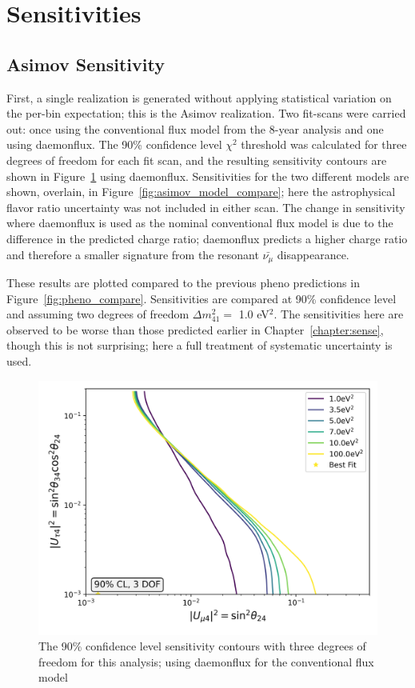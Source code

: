 \documentclass[main.tex]{subfiles}
\begin{document}
\section{Sensitivities}

\subsection{Asimov Sensitivity}

First, a single realization is generated without applying statistical variation on the per-bin expectation; this is the Asimov realization. 
Two fit-scans were carried out: once using the conventional flux model from the 8-year analysis and one using daemonflux. 
The 90\% confidence level $\chi^{2}$ threshold was calculated for three degrees of freedom for each fit scan, and the resulting sensitivity contours are shown in Figure~\ref{fig:asimov_daemon_sense} using daemonflux. 
Sensitivities for the two different models are shown, overlain, in Figure~\ref{fig:asimov_model_compare}; here the astrophysical flavor ratio uncertainty was not included in either scan. 
The change in sensitivity where daemonflux is used as the nominal conventional flux model is due to the difference in the predicted charge ratio; daemonflux predicts a higher charge ratio and therefore a smaller signature from the resonant $\bar{\nu_{\mu}}$ disappearance. 

These results are plotted compared to the previous pheno predictions in Figure~\ref{fig:pheno_compare}. 
Sensitivities are compared at 90\% confidence level and assuming two degrees of freedom $\Delta m_{41}^{2}=$ 1.0 eV$^{2}$.
The sensitivities here are observed to be worse than those predicted earlier in Chapter~\ref{chapter:sense}, though this is not surprising; here a full treatment of systematic uncertainty is used.

\begin{figure}
    \centering
    \includegraphics[width=0.7\linewidth]{figures/joint_daemon_asimov_with_flavor_update_Realization_daemon_newflavor_Asimov_sterile_0_cl0.9_dof3.png}
    \caption{The 90\% confidence level sensitivity contours with three degrees of freedom for this analysis; using daemonflux for the conventional flux model}\label{fig:asimov_daemon_sense}
\end{figure}
\end{document}
